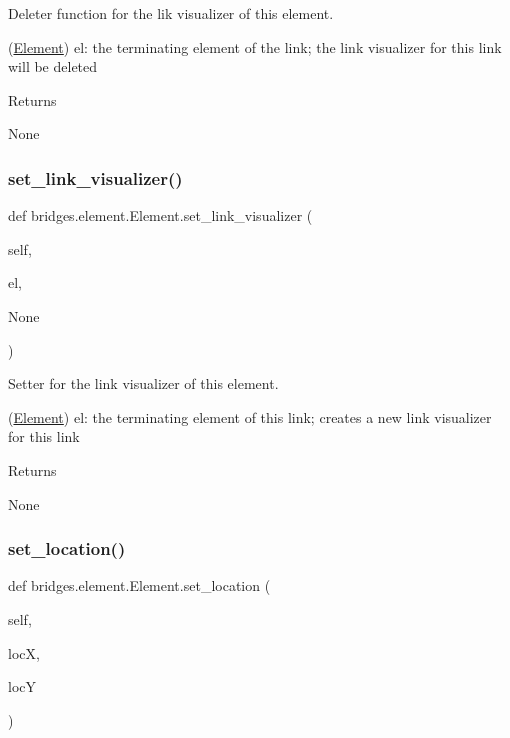 Deleter function for the lik visualizer of this element. 

(\hyperlink{classbridges_1_1element_1_1_element}{Element}) el\+: the terminating element of the link; the link visualizer for this link will be deleted \begin{DoxyReturn}{Returns}


None 
\end{DoxyReturn}
\mbox{\label{classbridges_1_1element_1_1_element_afe94604116e0dec9a60a4ea54a462323}} 
\subsubsection{\texorpdfstring{set\+\_\+link\+\_\+visualizer()}{set\_link\_visualizer()}}
{\footnotesize\ttfamily def bridges.\+element.\+Element.\+set\+\_\+link\+\_\+visualizer (\begin{DoxyParamCaption}\item[{}]{self,  }\item[{}]{el,  }\item[{}]{None }\end{DoxyParamCaption})}



Setter for the link visualizer of this element. 

(\hyperlink{classbridges_1_1element_1_1_element}{Element}) el\+: the terminating element of this link; creates a new link visualizer for this link \begin{DoxyReturn}{Returns}


None 
\end{DoxyReturn}
\mbox{\label{classbridges_1_1element_1_1_element_aa1387621f7afa6b6f6acd052a1126320}} 
\subsubsection{\texorpdfstring{set\+\_\+location()}{set\_location()}}
{\footnotesize\ttfamily def bridges.\+element.\+Element.\+set\+\_\+location (\begin{DoxyParamCaption}\item[{}]{self,  }\item[{}]{locX,  }\item[{}]{locY }\end{DoxyParamCaption})}




